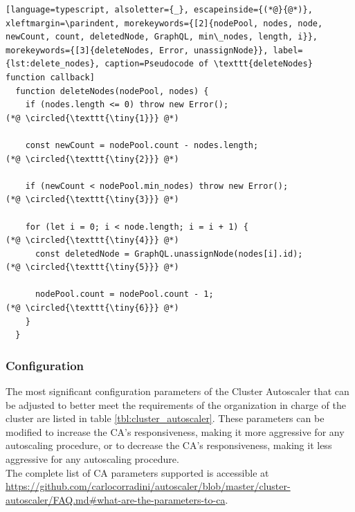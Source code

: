 \begin{lstlisting}[language=typescript, alsoletter={_}, escapeinside={(*@}{@*)}, xleftmargin=\parindent, morekeywords={[2]{nodePool, nodes, node, newCount, count, deletedNode, GraphQL, min\_nodes, length, i}}, morekeywords={[3]{deleteNodes, Error, unassignNode}}, label={lst:delete_nodes}, caption=Pseudocode of \texttt{deleteNodes} function callback]
  function deleteNodes(nodePool, nodes) {
    if (nodes.length <= 0) throw new Error();                                                     (*@ \circled{\texttt{\tiny{1}}} @*)

    const newCount = nodePool.count - nodes.length;                                               (*@ \circled{\texttt{\tiny{2}}} @*)

    if (newCount < nodePool.min_nodes) throw new Error();                                         (*@ \circled{\texttt{\tiny{3}}} @*)

    for (let i = 0; i < node.length; i = i + 1) {                                                 (*@ \circled{\texttt{\tiny{4}}} @*)
      const deletedNode = GraphQL.unassignNode(nodes[i].id);                                      (*@ \circled{\texttt{\tiny{5}}} @*)

      nodePool.count = nodePool.count - 1;                                                        (*@ \circled{\texttt{\tiny{6}}} @*)
    }
  }
\end{lstlisting}

\subsubsection{Configuration}
\label{subsubsec:implementation_autoscaling_cluster_autoscaler_configuration}

The most significant configuration parameters of the Cluster Autoscaler that can
be adjusted to better meet the requirements of the organization in charge of the
cluster are listed in table \ref{tbl:cluster_autoscaler}. These parameters can be
modified to increase the CA's responsiveness, making it more aggressive for any
autoscaling procedure, or to decrease the CA's responsiveness, making it less
aggressive for any autoscaling procedure. \\ %
The complete list of CA parameters supported is accessible at
\url{https://github.com/carlocorradini/autoscaler/blob/master/cluster-autoscaler/FAQ.md\#what-are-the-parameters-to-ca}.


